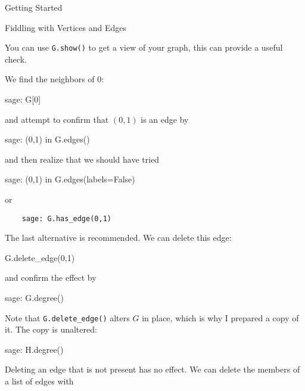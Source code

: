 \begin{chap}{Getting Started}
\begin{sect}{Fiddling with Vertices and Edges}
%
\begin{para}
You can use \verb|G.show()| to get a view of your graph, this can provide
a useful check.
\end{para}
%
\begin{para}
We find the neighbors of 0:
\end{para}
%
\begin{sageexample}
    sage: G[0]
\end{sageexample}
%
\begin{para}    
and attempt to confirm that $(0,1)$ is an edge by
\end{para}
%
\begin{sageexample}
    sage: (0,1) in G.edges()
\end{sageexample}
%
\begin{para}
and then realize that we should have tried
\end{para}
%
\begin{sageexample}
    sage: (0,1) in G.edges(labels=False)
\end{sageexample}
%
\begin{para}
or
\end{para}
%
\begin{verbatim}
    sage: G.has_edge(0,1)
\end{verbatim}
%
\begin{para}
The last alternative is recommended.
We can delete this edge:
\end{para}
%
\begin{sageblock}
G.delete_edge(0,1)
\end{sageblock}
%
\begin{para}
and confirm the effect by
\end{para}
%
\begin{para}
\begin{sageexample}
    sage: G.degree()
\end{sageexample}
\end{para}
%
\begin{para}
Note that \verb|G.delete_edge()| alters $G$ in place, which is why I
prepared a copy of it. The copy is unaltered:
\end{para}
%
\begin{sageexample}
    sage: H.degree()
\end{sageexample}
%
\begin{para}
Deleting an edge that is not present has no effect. We can delete
the members of a list of edges with 
\end{para}
%
\begin{verbatim}

\end{verbatim}
\end{sect}
\end{chap}
